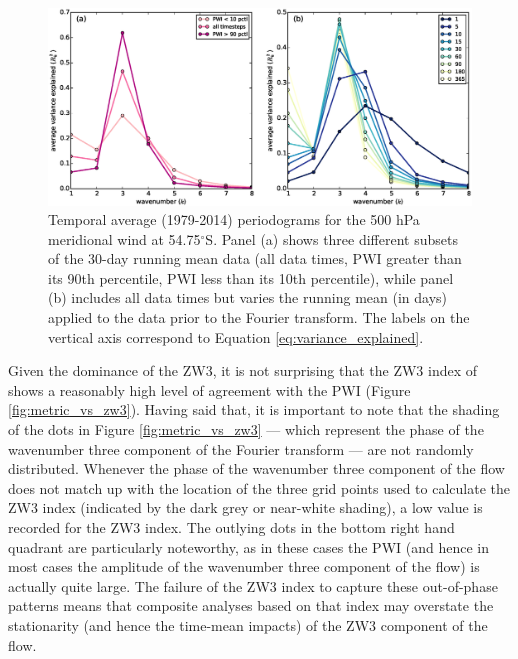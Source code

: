 \begin{figure}
\begin{center}
\includegraphics[width=1\columnwidth]{figures/zonalwaves/va-r2spectrum_ERAInterim_500hPa_daily_native-55S.eps}
\caption[Temporal average (1979-2014) periodograms for the 500 hPa meridional wind at 54.75$^{\circ}$S]{\label{fig:periodograms}
Temporal average (1979-2014) periodograms for the 500 hPa meridional wind at 54.75$^{\circ}$S. Panel (a) shows three different subsets of the 30-day running mean data (all data times, PWI greater than its 90th percentile, PWI less than its 10th percentile), while panel (b) includes all data times but varies the running mean (in days) applied to the data prior to the Fourier transform. The labels on the vertical axis correspond to Equation \ref{eq:variance_explained}.}
\end{center}
\end{figure}


Given the dominance of the ZW3, it is not surprising that the ZW3 index of \citet{Raphael2004} shows a reasonably high level of agreement with the PWI (Figure \ref{fig:metric_vs_zw3}). Having said that, it is important to note that the shading of the dots in Figure \ref{fig:metric_vs_zw3} --- which represent the phase of the wavenumber three component of the Fourier transform --- are not randomly distributed. Whenever the phase of the wavenumber three component of the flow does not match up with the location of the three grid points used to calculate the ZW3 index (indicated by the dark grey or near-white shading), a low value is recorded for the ZW3 index. The outlying dots in the bottom right hand quadrant are particularly noteworthy, as in these cases the PWI (and hence in most cases the amplitude of the wavenumber three component of the flow) is actually quite large. The failure of the ZW3 index to capture these out-of-phase patterns means that composite analyses based on that index may overstate the stationarity (and hence the time-mean impacts) of the ZW3 component of the flow.


